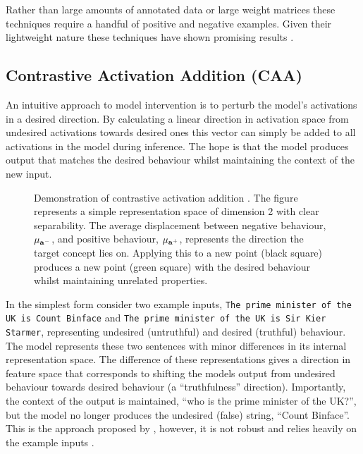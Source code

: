 Rather than large amounts of annotated data or large weight matrices these techniques require a handful of positive and negative examples.
Given their lightweight nature these techniques have shown promising results \citep{steering-taxonomy, steering-theory, steering-clear, reft}.

\subsection{Contrastive Activation Addition (CAA)}
\label{caa}

An intuitive approach to model intervention is to perturb the model's activations in a desired direction.
By calculating a linear direction in activation space from undesired activations towards desired ones this vector can simply be added to all activations in the model during inference.
The hope is that the model produces output that matches the desired behaviour whilst maintaining the context of the new input.

\begin{figure}
    \centering
    \captionsetup{width=.9\textwidth}
    
    \caption{Demonstration of contrastive activation addition \citep{caa}. The figure represents a simple representation space of dimension 2 with clear separability. The average displacement between negative behaviour, $\mathbf{\mu}_{\mathbf{a}^-}$, and positive behaviour, $\mathbf{\mu}_{\mathbf{a}^+}$, represents the direction the target concept lies on. Applying this to a new point (black square) produces a new point (green square) with the desired behaviour whilst maintaining unrelated properties.}
    \label{fig:caa}
\end{figure}

In the simplest form consider two example inputs, \texttt{The prime minister of the UK is Count Binface} and \texttt{The prime minister of the UK is Sir Kier Starmer},  representing undesired (untruthful) and desired (truthful) behaviour.
The model represents these two sentences with minor differences in its internal representation space.
The difference of these representations gives a direction in feature space that corresponds to shifting the models output from undesired behaviour towards desired behaviour (a ``truthfulness'' direction).
Importantly, the context of the output is maintained, ``who is the prime minister of the UK?'', but the model no longer produces the undesired (false) string, ``Count Binface''.
This is the approach proposed by \citet{activation-addition}, however, it is not robust and relies heavily on the example inputs \citep{caa}.

